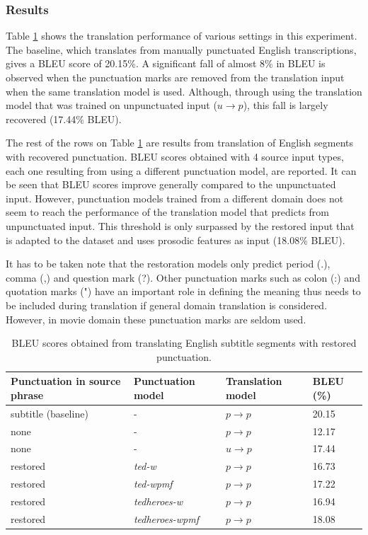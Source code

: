 \subsubsection{Results}

Table \ref{table:punkEffect} shows the translation performance of various settings in this experiment. The baseline, which translates from manually punctuated English transcriptions, gives a BLEU score of 20.15\%. A significant fall of almost 8\% in BLEU is observed when the punctuation marks are removed from the translation input when the same translation model is used. Although, through using the translation model that was trained on unpunctuated input ($ u \rightarrow p $), this fall is largely recovered (17.44\% BLEU). 

The rest of the rows on Table \ref{table:punkEffect} are results from translation of English segments with recovered punctuation. BLEU scores obtained with 4 source input types, each one resulting from using a different punctuation model, are reported. It can be seen that BLEU scores improve generally compared to the unpunctuated input. However, punctuation models trained from a different domain does not seem to reach the performance of the translation model that predicts from unpunctuated input. This threshold is only surpassed by the restored input that is adapted to the dataset and uses prosodic features as input (18.08\% BLEU). 

It has to be taken note that the restoration models only predict period (.), comma (,) and question mark (?). Other punctuation marks such as colon (:) and quotation marks (") have an important role in defining the meaning thus needs to be included during translation if general domain translation is considered. However, in movie domain these punctuation marks are seldom used. 
\begin{table}[!tbp]
\begin{tabular}{p{4cm}p{3cm}ll}
\toprule
\textbf{Punctuation in source phrase} & \textbf{Punctuation model} & \textbf{Translation model} & \textbf{BLEU (\%)}\\
\midrule
subtitle (baseline) & -                       & $ p \rightarrow p $   & 20.15  \\
none                & -                       & $ p \rightarrow p $   & 12.17  \\
none                & -                       & $ u \rightarrow p $   & 17.44  \\
restored            & \textit{ted-w}          & $ p \rightarrow p $   & 16.73  \\
restored            & \textit{ted-wpmf}       & $ p \rightarrow p $   & 17.22  \\
restored            & \textit{tedheroes-w}    & $ p \rightarrow p $   & 16.94  \\
restored            & \textit{tedheroes-wpmf} & $ p \rightarrow p $   & 18.08  \\
\bottomrule
\end{tabular}
\caption{BLEU scores obtained from translating English subtitle segments with restored punctuation.}
\label{table:punkEffect}
\end{table}

